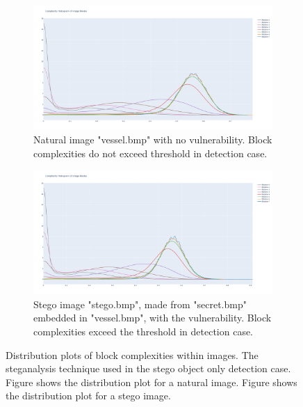 \documentclass{l4proj}
\begin{document}
\begin{figure}[!h]
    \centering
    \begin{subfigure}[b]{0.85\textwidth}
        \includegraphics[width=\textwidth]{images/natural_no_vuln.png}
        \caption{Natural image "vessel.bmp" with no vulnerability. Block complexities do not exceed threshold in detection case.}
        \label{fig:natural_no_vuln}
    \end{subfigure}
    \begin{subfigure}[b]{0.85\textwidth}
        \includegraphics[width=\textwidth]{images/stego_vuln.png}
        \caption{Stego image "stego.bmp", made from "secret.bmp" embedded in "vessel.bmp", with the vulnerability. Block complexities exceed the threshold in detection case.}
        \label{fig:stego_vuln}
    \end{subfigure}
    \caption{Distribution plots of block complexities within images. The steganalysis technique used in the stego object only detection case. Figure  shows the distribution plot for a natural image. Figure  shows the distribution plot for a stego image.}
\end{figure}
\end{document}
